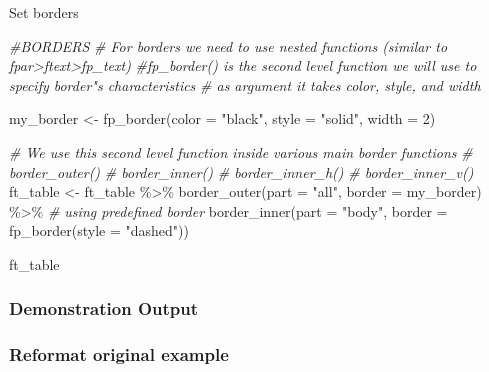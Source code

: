 \documentclass[
]{book}
\newenvironment{Shaded}{\begin{snugshade}}{\end{snugshade}}
\newcommand{\AttributeTok}[1]{\textcolor[rgb]{0.77,0.63,0.00}{#1}}
\newcommand{\CommentTok}[1]{\textcolor[rgb]{0.56,0.35,0.01}{\textit{#1}}}
\newcommand{\DecValTok}[1]{\textcolor[rgb]{0.00,0.00,0.81}{#1}}
\newcommand{\FunctionTok}[1]{\textcolor[rgb]{0.00,0.00,0.00}{#1}}
\newcommand{\NormalTok}[1]{#1}
\newcommand{\OtherTok}[1]{\textcolor[rgb]{0.56,0.35,0.01}{#1}}
\newcommand{\SpecialCharTok}[1]{\textcolor[rgb]{0.00,0.00,0.00}{#1}}
\newcommand{\StringTok}[1]{\textcolor[rgb]{0.31,0.60,0.02}{#1}}
\begin{document}
Set borders

\begin{Shaded}
\begin{Highlighting}[]
\CommentTok{\#BORDERS}
\CommentTok{\# For borders we need to use nested functions (similar to fpar\textgreater{}ftext\textgreater{}fp\_text)}
\CommentTok{\#fp\_border() is the second level function we will use to specify border"s characteristics}
\CommentTok{\# as argument it takes color, style, and width}
  
\NormalTok{my\_border }\OtherTok{\textless{}{-}} \FunctionTok{fp\_border}\NormalTok{(}\AttributeTok{color =} \StringTok{"black"}\NormalTok{, }\AttributeTok{style =} \StringTok{"solid"}\NormalTok{, }\AttributeTok{width =} \DecValTok{2}\NormalTok{)}

\CommentTok{\# We use this second level function inside various main border functions}
\CommentTok{\# border\_outer()}
\CommentTok{\# border\_inner()}
\CommentTok{\# border\_inner\_h()}
\CommentTok{\# border\_inner\_v()}
\NormalTok{ft\_table }\OtherTok{\textless{}{-}}\NormalTok{ ft\_table }\SpecialCharTok{\%\textgreater{}\%}
  \FunctionTok{border\_outer}\NormalTok{(}\AttributeTok{part =} \StringTok{"all"}\NormalTok{, }\AttributeTok{border =}\NormalTok{ my\_border) }\SpecialCharTok{\%\textgreater{}\%} \CommentTok{\# using predefined border}
  \FunctionTok{border\_inner}\NormalTok{(}\AttributeTok{part =} \StringTok{"body"}\NormalTok{, }\AttributeTok{border =} \FunctionTok{fp\_border}\NormalTok{(}\AttributeTok{style =} \StringTok{"dashed"}\NormalTok{))}

\NormalTok{ft\_table}
\end{Highlighting}
\end{Shaded}

\hypertarget{demonstration-output}{%
\subsubsection{Demonstration Output}\label{demonstration-output}}

\hypertarget{reformat-original-example}{%
\subsubsection{Reformat original example}\label{reformat-original-example}}
\end{document}
